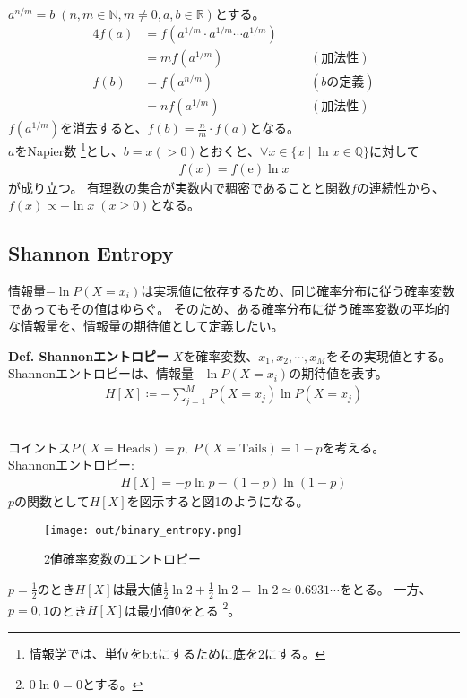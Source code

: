 \documentclass{ltjsarticle}
\begin{document}
\\
$a^{n/m} = b \; (n, m \in \mathbb{N}, m \neq 0, a, b \in \mathbb{R})$とする。
\begin{alignat*}{4}
  f(a) &= f(a^{1/m} \cdot a^{1/m} \cdots a^{1/m}) \\
  &= m f(a^{1/m}) && \quad (\text{加法性}) \\
  f(b) &= f(a^{n/m}) && \quad (\text{$b$の定義}) \\
  &= n f(a^{1/m}) && \quad (\text{加法性})
\end{alignat*}
$f(a^{1/m})$を消去すると、$f(b)=\frac{n}{m} \cdot f(a)$となる。\\
$a$をNapier数 \footnote{情報学では、単位をbitにするために底を2にする。}とし、$b=x(>0)$とおくと、$\forall x \in \{ x \mid \ln{x} \in \mathbb{Q} \}$に対して
\begin{align}
  f(x) = f(\mathrm{e}) \ln{x}
\end{align}
が成り立つ。
有理数の集合が実数内で稠密であることと関数$f$の連続性から、\\
$f(x) \propto - \ln{x} \; (x \geq 0)$となる。\\

\subsection{Shannon Entropy}

情報量$-\ln{P(X=x_i)}$は実現値に依存するため、同じ確率分布に従う確率変数であってもその値はゆらぐ。
そのため、ある確率分布に従う確率変数の平均的な情報量を、情報量の期待値として定義したい。
\begin{itembox}[l]{\textbf{Def. Shannonエントロピー}}
$X$を確率変数、$x_1, x_2, \cdots, x_M$をその実現値とする。
Shannonエントロピーは、情報量$-\ln{P(X=x_i)}$の期待値を表す。
  \begin{align}
    H[X] \coloneq - \sum_{j=1}^M P(X=x_j) \ln{P(X=x_j)}
  \end{align}
\end{itembox}

\smallskip

\\
コイントス$P(X=\mathrm{Heads})=p, \; P(X=\mathrm{Tails})=1-p$を考える。\\
Shannonエントロピー:
\begin{align}
  H[X] = - p \ln{p} - (1-p) \ln{(1-p)}
\end{align}
$p$の関数として$H[X]$を図示すると図1のようになる。
\begin{figure}[H]
  \centering
  \texttt{[image: out/binary\_entropy.png]}
  \caption{2値確率変数のエントロピー} \label{binaryentropy}
\end{figure}
$p=\frac{1}{2}$のとき$H[X]$は最大値$\frac{1}{2} \ln{2} + \frac{1}{2} \ln{2} = \ln{2} \simeq 0.6931 \cdots$をとる。
一方、$p=0, 1$のとき$H[X]$は最小値$0$をとる \footnote{$0\ln{0}=0$とする。}。
\end{document}
